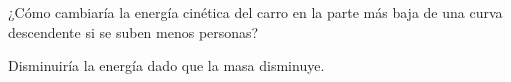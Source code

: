 ¿Cómo cambiaría la energía cinética del carro en la parte más baja de
una curva descendente si se suben menos personas?


\begin{solutionbox}{2cm}
    Disminuiría la energía dado que la masa disminuye.
\end{solutionbox}
